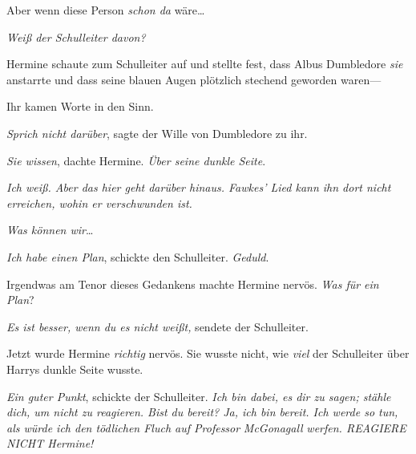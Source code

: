 Aber wenn diese Person \emph{schon da} wäre…

\emph{Weiß der Schulleiter davon?}

Hermine schaute zum Schulleiter auf und stellte fest, dass Albus Dumbledore \emph{sie} anstarrte und dass seine blauen Augen plötzlich stechend geworden waren—

Ihr kamen Worte in den Sinn.

\emph{Sprich nicht darüber}, sagte der Wille von Dumbledore zu ihr.

\emph{Sie wissen}, dachte Hermine. \emph{Über seine dunkle Seite}.

\emph{Ich weiß. Aber das hier geht darüber hinaus. Fawkes' Lied kann ihn dort nicht erreichen, wohin er verschwunden ist.}

\emph{Was können wir}…

\emph{Ich habe einen Plan}, schickte den Schulleiter. \emph{Geduld}.

Irgendwas am Tenor dieses Gedankens machte Hermine nervös. \emph{Was für ein Plan}?

\emph{Es ist besser, wenn du es nicht weißt,} sendete der Schulleiter.

Jetzt wurde Hermine \emph{richtig} nervös. Sie wusste nicht, wie \emph{viel} der Schulleiter über Harrys dunkle Seite wusste.

\emph{Ein guter Punkt}, schickte der Schulleiter. \emph{Ich bin dabei, es dir zu sagen; stähle dich, um nicht zu reagieren. Bist du bereit? Ja, ich bin bereit. Ich werde so tun, als würde ich den tödlichen Fluch auf Professor} \emph{McGonagall} \emph{werfen. REAGIERE NICHT Hermine!}

